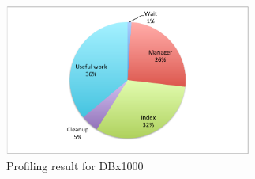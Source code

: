 \begin{figure}[h]
  \centering
  \includegraphics[width=3.2in]{figures/profile.pdf}
  \caption{Profiling result for DBx1000}
  \label{fig:profile}
\end{figure}
